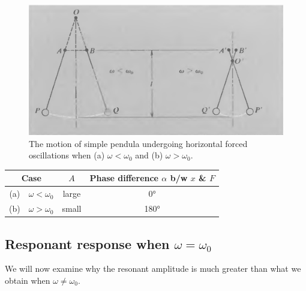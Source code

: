 \begin{figure}[h]
	\centering
	\includegraphics[scale=0.7]{phys232/Ch4-forced-no-damping-pendula.png} 
	\caption{The motion of simple pendula undergoing horizontal forced oscillations when (a) $\omega<\omega_0$ and (b) $\omega>\omega_0$.}\label{ch4:no-damping-pendula}
\end{figure}

\begin{center}
\begin{tabular}{cccc}
	\hline
	\multicolumn{2}{c}{Case} & $A$ & \parbox{3cm}{\centering Phase difference $\alpha$ b/w $x$ \& $F$}  \\
	\hline
	(a) & $\omega < \omega_0$ & large & 0° \\
	(b) & $\omega > \omega_0$ & small & 180° \\
	\hline
\end{tabular}
\end{center}


\subsection{Responant response when $\omega = \omega_0$}

We will now examine why the resonant amplitude is much greater than what we obtain when $\omega\neq \omega_0$.

